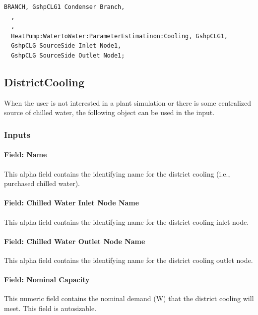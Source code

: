 \begin{lstlisting}
BRANCH, GshpCLG1 Condenser Branch,
  ,
  ,
  HeatPump:WatertoWater:ParameterEstimatinon:Cooling, GshpCLG1,
  GshpCLG SourceSide Inlet Node1,
  GshpCLG SourceSide Outlet Node1;
\end{lstlisting}

\subsection{DistrictCooling}\label{districtcooling}

When the user is not interested in a plant simulation or there is some centralized source of chilled water, the following object can be used in the input.

\subsubsection{Inputs}\label{inputs-16-008}

\paragraph{Field: Name}\label{field-name-15-006}

This alpha field contains the identifying name for the district cooling (i.e., purchased chilled water).

\paragraph{Field: Chilled Water Inlet Node Name}\label{field-chilled-water-inlet-node-name-9}

This alpha field contains the identifying name for the district cooling inlet node.

\paragraph{Field: Chilled Water Outlet Node Name}\label{field-chilled-water-outlet-node-name-10}

This alpha field contains the identifying name for the district cooling outlet node.

\paragraph{Field: Nominal Capacity}\label{field-nominal-capacity-10}

This numeric field contains the nominal demand (W) that the district cooling will meet. This field is autosizable.

